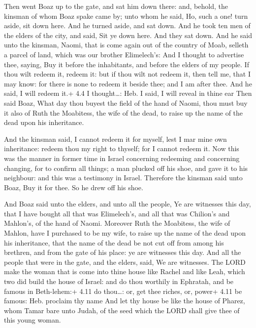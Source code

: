  Then went Boaz up to the gate, and sat him down there: and,
behold, the kinsman of whom Boaz spake came by; unto whom he said, Ho,
such a one! turn aside, sit down here. And he turned aside, and sat
down.  And he took ten men of the elders of the city, and
said, Sit ye down here. And they sat down.  And he said unto
the kinsman, Naomi, that is come again out of the country of Moab,
selleth a parcel of land, which was our brother Elimelech's:
 And I thought to advertise thee, saying, Buy it before the
inhabitants, and before the elders of my people. If thou wilt redeem it,
redeem it: but if thou wilt not redeem it, then tell me, that I may
know: for there is none to redeem it beside thee; and I am after thee.
And he said, I will redeem it.+ 4.4 I thought\ldots: Heb. I said, I will
reveal in thine ear  Then said Boaz, What day thou buyest
the field of the hand of Naomi, thou must buy it also of Ruth the
Moabitess, the wife of the dead, to raise up the name of the dead upon
his inheritance.

 And the kinsman said, I cannot redeem it for myself, lest
I mar mine own inheritance: redeem thou my right to thyself; for I
cannot redeem it.  Now this was the manner in former time in
Israel concerning redeeming and concerning changing, for to confirm all
things; a man plucked off his shoe, and gave it to his neighbour: and
this was a testimony in Israel.  Therefore the kinsman said
unto Boaz, Buy it for thee. So he drew off his shoe.

 And Boaz said unto the elders, and unto all the people,
Ye are witnesses this day, that I have bought all that was Elimelech's,
and all that was Chilion's and Mahlon's, of the hand of Naomi.
 Moreover Ruth the Moabitess, the wife of Mahlon, have I
purchased to be my wife, to raise up the name of the dead upon his
inheritance, that the name of the dead be not cut off from among his
brethren, and from the gate of his place: ye are witnesses this day.
 And all the people that were in the gate, and the elders,
said, We are witnesses. The LORD make the woman that is come into thine
house like Rachel and like Leah, which two did build the house of
Israel: and do thou worthily in Ephratah, and be famous in Beth-lehem:+
4.11 do thou\ldots: or, get thee riches, or, power+ 4.11 be famous: Heb.
proclaim thy name  And let thy house be like the house of
Pharez, whom Tamar bare unto Judah, of the seed which the LORD shall
give thee of this young woman.

